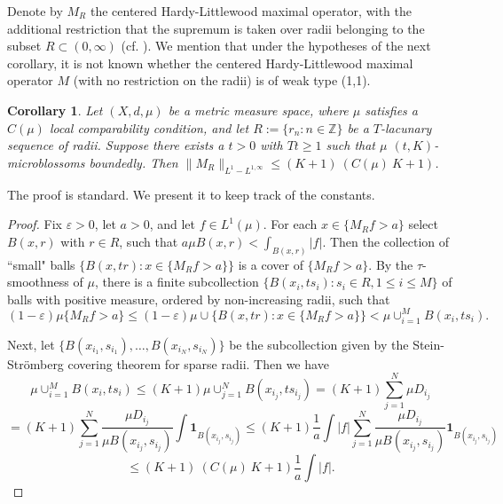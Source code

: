 \documentclass[12pt]{amsart}
\newtheorem{corollary}[theorem]{Corollary}
\theoremstyle{definition}
\theoremstyle{parrafo}
\begin{document}
 Denote by $M_R$ the centered Hardy-Littlewood maximal operator, with the additional restriction 
 that the supremum is taken over radii belonging to the subset $R\subset (0,\infty)$ (cf. \cite[p. 735]{NaTa}).
We mention that under the hypotheses of the next corollary, it is not known whether  
 the centered Hardy-Littlewood maximal operator  $M$ (with no restriction on the radii)  is of weak type (1,1).

\begin{corollary}\label{MR}  Let $(X, d, \mu)$ be a metric measure space, where $\mu$ satisfies a $C(\mu)$ local comparability condition, and let $R:= \{r_n: n\in \mathbb{Z}\}$ be a $T$-lacunary sequence of radii. Suppose there exists a $t > 0$ with $T  t \ge 1$ 
such that 
$\mu$ $(t, K)$-microblossoms boundedly. Then $\|M_R\|_{L^1-L^{1,\infty}} \le (K + 1) \ (C(\mu) \ K + 1)$.
 \end{corollary}
  The proof is standard. We present it  to keep track of the constants.
 
 \begin{proof} Fix $\varepsilon > 0$, let $a > 0$, and let $f\in L^1(\mu)$. 
 For each $x\in \{M_R f > a\}$ select $B(x,r)$ with $r\in R$, such that $a \mu B(x,r) < \int_{B(x,r)} |f|$.
 Then  the collection of ``small" balls $\{ B(x, tr) : x\in  \{M_R f > a\}\}$ is a cover of $\{M_R f > a\}$.
 By the $\tau$-smoothness of $\mu$, there is a finite subcollection 
 $\{B(x_i, t s_i): s_i \in R, 1 \le i \le M\}$ 
of balls with positive measure, ordered by non-increasing radii,  such that
$$
(1 - \varepsilon) \mu \{M_R f > a\} 
\le
(1 - \varepsilon) \mu \cup \{ B(x, tr) : x\in  \{M_R f > a\}\}
< 
\mu \cup_{i= 1}^M B(x_i, t s_i).
$$

Next, let $\{B(x_{i_1}, s_{i_1}), \dots, B(x_{i_N}, s_{i_N})\}$ be the subcollection
given by  the Stein-Str\"omberg covering theorem for sparse radii. Then we have
$$
\mu \cup_{i= 1}^M B(x_i, t s_i)
\le 
(K + 1) \mu \cup_{j=1}^N   B(x_{i_j}, t s_{i_j})
=
(K + 1) \sum_{j=1}^N \mu D_{i_j} 
$$
$$
=
(K + 1) \sum_{j=1}^N \frac{\mu D_{i_j} }{\mu B(x_{i_j}, s_{i_j})}\int \mathbf{1}_{B(x_{i_j}, s_{i_j})}
\le
(K + 1)  \frac{1}{a }\int  |f| \sum_{j=1}^N \frac{\mu D_{i_j} }{\mu B(x_{i_j}, s_{i_j})}\mathbf{1}_{B(x_{i_j}, s_{i_j})}
$$
$$\le (K + 1) \ (C(\mu) \ K + 1) \frac{1}{a }\int  |f| .
$$
 \end{proof}
 
\end{document}
